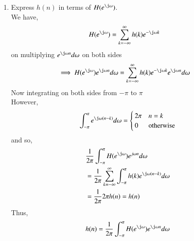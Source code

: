 \documentclass[journal,12pt,twocolumn]{IEEEtran}
\renewcommand\thesection{\arabic{section}}
\begin{document}
\begin{enumerate}[label=\thesection.\arabic*,ref=\thesection.\theenumi]
\item Express $h(n)$ in terms of $H(e^{\j\omega})$.\\
\solution We have,
\begin{align}
	H(e^{\j\omega}) &= \sum_{k = -\infty}^{\infty}h(k)e^{-\j\omega k}
\end{align} 
on multiplying $e^{\j\omega n}d\omega$ on both sides\\
\begin{align}
	\implies H(e^{\j\omega})e^{\j\omega n}d\omega &= \sum_{k = -\infty}^{\infty}h(k)e^{-\j\omega k}e^{\j\omega n}d\omega
\end{align} 
Now integrating on both sides from $-\pi$ to $\pi$\\
However,
\begin{align}
	\int_{-\pi}^{\pi}e^{\j\omega(n - k)}d\omega =
	\begin{cases}
		2\pi & n = k \\
		0 & \textrm{otherwise}
	\end{cases}
\end{align}
and so,
\begin{align}
	&\frac{1}{2\pi}\int_{-\pi}^{\pi}H(e^{\j\omega})e^{j\omega n}d\omega \\
	&= \frac{1}{2\pi}\sum_{k = -\infty}^{\infty}\int_{-\pi}^{\pi}h(k)e^{\j\omega(n - k)}d\omega \\
	&= \frac{1}{2\pi}2\pi h(n) = h(n)
\end{align}
 Thus,
\begin{align}
	h(n) &= \frac{1}{2\pi}\int_{-\pi}^{\pi}H(e^{\j\omega})e^{\j\omega n}d\omega \\
	\label{eq:idtft}
\end{align}
\end{enumerate}
\end{document}
